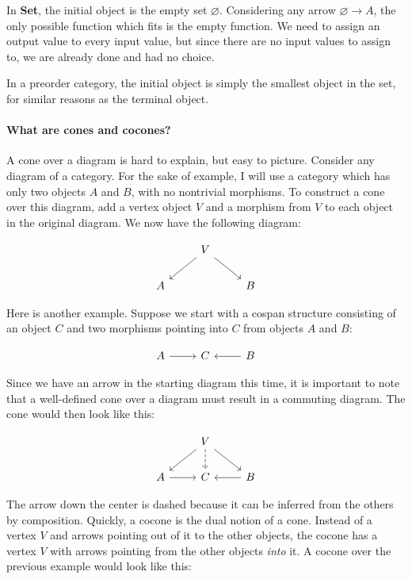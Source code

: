 \documentclass{article}
\begin{document}
In \textbf{Set}, the initial object is the empty set \(\varnothing\).
Considering any arrow \(\varnothing \to A\), the only possible function which
fits is the empty function. We need to assign an output value to every input
value, but since there are no input values to assign to, we are already done
and had no choice.

In a preorder category, the initial object is simply the smallest object in the
set, for similar reasons as the terminal object.

\paragraph{What are cones and cocones?}

A cone over a diagram is hard to explain, but easy to picture. Consider any
diagram of a category. For the sake of example, I will use a category which has
only two objects \(A\) and \(B\), with no nontrivial morphisms. To construct a
cone over this diagram, add a vertex object \(V\) and a morphism from \(V\) to
each object in the original diagram. We now have the following diagram:

\[
  \begin{tikzcd}
      & V \arrow[ld] \arrow[rd] &   \\
    A &                         & B
  \end{tikzcd}
\]

Here is another example. Suppose we start with a cospan structure consisting of
an object \(C\) and two morphisms pointing into \(C\) from objects \(A\) and
\(B\):

\[
  \begin{tikzcd}
    A \arrow[r] & C & B \arrow[l]
  \end{tikzcd}
\]

Since we have an arrow in the starting diagram this time, it is important to
note that a well-defined cone over a diagram must result in a commuting
diagram. The cone would then look like this:

\[
  \begin{tikzcd}
                & V \arrow[ld] \arrow[rd] \arrow[d, dashed] &             \\
    A \arrow[r] & C                                         & B \arrow[l]
  \end{tikzcd}
\]

The arrow down the center is dashed because it can be inferred from the others
by composition. Quickly, a cocone is the dual notion of a cone. Instead of a
vertex \(V\) and arrows pointing out of it to the other objects, the cocone has
a vertex \(V\) with arrows pointing from the other objects \textit{into} it. A
cocone over the previous example would look like this:
\end{document}
